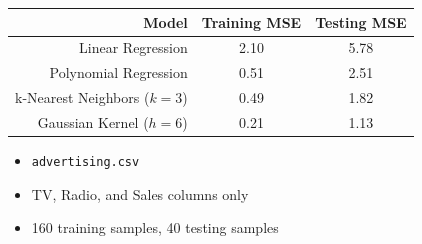 \documentclass[xcolor={dvipsnames}]{beamer}
\begin{document}
\begin{frame}
    \setlength\parskip{0.75em}

    \begin{center}
    \begin{tabular}{rcc}
        \textbf{Model} & \textbf{Training MSE} & \textbf{Testing MSE}\\[1ex]\hline
        Linear Regression & 2.10 & 5.78\\[1ex]
        Polynomial Regression & 0.51 & 2.51\\[1ex]
        k-Nearest Neighbors ($k=3$) & 0.49 & 1.82\\[1ex]
        Gaussian Kernel ($h=6$) & 0.21 & 1.13\\\hline
    \end{tabular}
\end{center}

\begin{itemize}
    \setlength\parskip{0.75em}

    \item \texttt{advertising.csv}
    \item TV, Radio, and Sales columns only
    \item 160 training samples, 40 testing samples
\end{itemize}


    

\end{frame}
\end{document}
